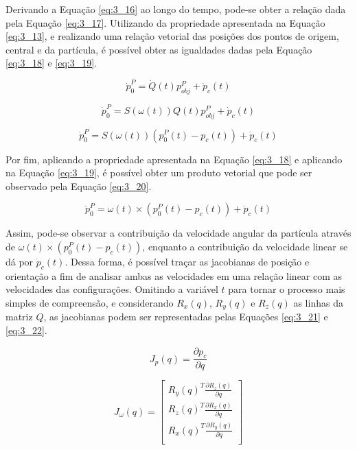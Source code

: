 Derivando a Equação \ref{eq:3_16} ao longo do tempo, pode-se obter a relação dada pela Equação \ref{eq:3_17}. Utilizando da propriedade apresentada na Equação \ref{eq:3_13}, e realizando uma relação vetorial das posições dos pontos de origem, central e da partícula, é possível obter as igualdades dadas pela Equação \ref{eq:3_18} e \ref{eq:3_19}.

\begin{equation}
\dot{p}^P_0 = \dot{Q}(t)p^P_{obj} + \dot{p}_c(t)
\label{eq:3_17}
\end{equation}

\begin{equation}
\dot{p}^P_0 = S(\omega(t))Q(t)p^P_{obj} + \dot{p}_c(t)
\label{eq:3_18}
\end{equation}

\begin{equation}
\dot{p}^P_0 = S(\omega(t))(p^P_0(t) - p_c(t)) + \dot{p}_c(t)
\label{eq:3_19}
\end{equation}

Por fim, aplicando a propriedade apresentada na Equação \ref{eq:3_18} e aplicando na Equação \ref{eq:3_19}, é possível obter um produto vetorial que pode ser observado pela Equação \ref{eq:3_20}.

\begin{equation}
\dot{p}^P_0 = \omega(t) \times (p^P_0(t) - p_c(t)) + \dot{p}_c(t)
\label{eq:3_20}
\end{equation}

Assim, pode-se observar a contribuição da velocidade angular da partícula através de $\omega(t) \times (p^P_0(t) - p_c(t))$, enquanto a contribuição da velocidade linear se dá por $\dot{p}_c(t)$. Dessa forma, é possível traçar as jacobianas de posição e orientação a fim de analisar ambas as velocidades em uma relação linear com as velocidades das configurações. Omitindo a variável $t$ para tornar o processo mais simples de compreensão, e considerando $R_x(q)$, $R_y(q)$ e $R_z(q)$ as linhas da matriz $Q$, as jacobianas podem ser representadas pelas Equações \ref{eq:3_21} e \ref{eq:3_22}.

\begin{equation}
J_p(q) = \frac{\partial p_c}{\partial q}
\label{eq:3_21}
\end{equation}

\begin{equation}
J_{\omega}(q) =
\begin{bmatrix}
R_y(q)^T \frac{\partial R_z(q)}{\partial q}\\
R_z(q)^T \frac{\partial R_x(q)}{\partial q}\\
R_x(q)^T \frac{\partial R_y(q)}{\partial q}\\
\end{bmatrix}
\label{eq:3_22}
\end{equation}

